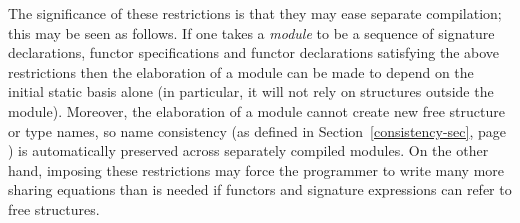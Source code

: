 {The 
significance of these restrictions is that they may ease separate
compilation; this may be seen as follows. If one takes a {\sl module}
to be a sequence of signature declarations, functor specifications
and functor declarations satisfying the above restrictions then the
elaboration of a module can be made to depend on the initial
static basis alone (in particular, it will not rely on
structures outside the module). Moreover, the elaboration 
of a module cannot create new free structure or type names, so 
name consistency (as defined in Section~\ref{consistency-sec}, 
page \pageref{consistency-sec}) is automatically preserved
across separately compiled modules. On the other hand,
imposing these restrictions may force the programmer to write
many more sharing equations than is needed if functors
and signature expressions can refer to free structures.
}



